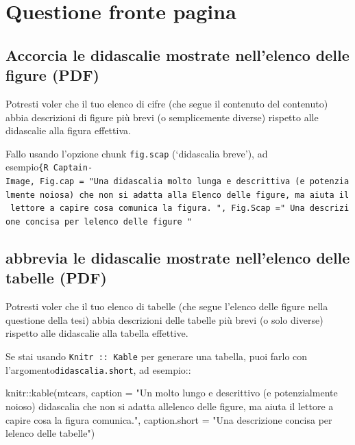 \documentclass[a4paper, 11pt, nobind]{templates/ociamthesis}
\newenvironment{Shaded}{\begin{snugshade}}{\end{snugshade}}
\newcommand{\AttributeTok}[1]{\textcolor[rgb]{0.77,0.63,0.00}{#1}}
\newcommand{\FunctionTok}[1]{\textcolor[rgb]{0.00,0.00,0.00}{#1}}
\newcommand{\NormalTok}[1]{#1}
\newcommand{\SpecialCharTok}[1]{\textcolor[rgb]{0.00,0.00,0.00}{#1}}
\newcommand{\StringTok}[1]{\textcolor[rgb]{0.31,0.60,0.02}{#1}}
\renewenvironment{Shaded}
{
  \vspace{10pt}%
  \begin{snugshade}%
}{%
  \end{snugshade}%
  \vspace{8pt}%
}
\begin{document}
\hypertarget{questione-fronte-pagina}{%
\section{Questione fronte pagina}\label{questione-fronte-pagina}}

\hypertarget{accorcia-le-didascalie-mostrate-nellelenco-delle-figure-pdf}{%
\subsection{Accorcia le didascalie mostrate nell'elenco delle figure (PDF)}\label{accorcia-le-didascalie-mostrate-nellelenco-delle-figure-pdf}}

Potresti voler che il tuo elenco di cifre (che segue il contenuto del contenuto) abbia descrizioni di figure più brevi (o semplicemente diverse) rispetto alle didascalie alla figura effettiva.

Fallo usando l'opzione chunk \texttt{fig.scap} (`didascalia breve'), ad esempio\texttt{\{R\ Captain-Image,\ Fig.cap\ =\ "Una\ didascalia\ molto\ lunga\ e\ descrittiva\ (e\ potenzialmente\ noiosa)\ che\ non\ si\ adatta\ alla\ Elenco\ delle\ figure,\ ma\ aiuta\ il\ lettore\ a\ capire\ cosa\ comunica\ la\ figura.\ ",\ Fig.Scap\ ="\ Una\ descrizione\ concisa\ per\ l\textquotesingle{}elenco\ delle\ figure\ "}

\hypertarget{abbrevia-le-didascalie-mostrate-nellelenco-delle-tabelle-pdf}{%
\subsection{abbrevia le didascalie mostrate nell'elenco delle tabelle (PDF)}\label{abbrevia-le-didascalie-mostrate-nellelenco-delle-tabelle-pdf}}

Potresti voler che il tuo elenco di tabelle (che segue l'elenco delle figure nella questione della tesi) abbia descrizioni delle tabelle più brevi (o solo diverse) rispetto alle didascalie alla tabella effettive.

Se stai usando \texttt{Knitr\ ::\ Kable} per generare una tabella, puoi farlo con l'argomento\texttt{didascalia.short}, ad esempio::

\begin{Shaded}
\begin{Highlighting}[]
\NormalTok{knitr}\SpecialCharTok{::}\FunctionTok{kable}\NormalTok{(mtcars,}
              \AttributeTok{caption =} \StringTok{"Un molto lungo e descrittivo (e potenzialmente}
\StringTok{               noioso) didascalia che non si adatta all\textquotesingle{}elenco delle figure,}
\StringTok{               ma aiuta il lettore a capire cosa la figura}
\StringTok{               comunica."}\NormalTok{,}
              \AttributeTok{caption.short =} \StringTok{"Una descrizione concisa per l\textquotesingle{}elenco delle tabelle"}\NormalTok{)}
\end{Highlighting}
\end{Shaded}
\end{document}
